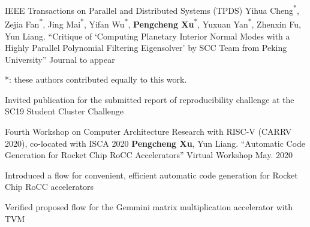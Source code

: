 
\clearpage



\begin{cventries}

  \cventry
    {IEEE Transactions on Parallel and Distributed Systems (TPDS)}
    {{\normalfont Yihua Cheng\textsuperscript{*}, Zejia Fan\textsuperscript{*}, Jing Mai\textsuperscript{*}, Yifan Wu\textsuperscript{*}, \textbf{Pengcheng Xu}\textsuperscript{*}, Yuxuan Yan\textsuperscript{*}, Zhenxin Fu, Yun Liang. ``Critique of `Computing Planetary Interior Normal Modes with a Highly Parallel Polynomial Filtering Eigensolver' by SCC Team from Peking University''}}
    {Journal} %
    {to appear} %
    {
      \begin{cvitems} %
      \item {*: these authors contributed equally to this work.}
      \item {Invited publication for the submitted report of reproducibility challenge at the SC19 Student Cluster Challenge}
      \end{cvitems}
    }

  \cventry
    {Fourth Workshop on Computer Architecture Research with RISC-V (CARRV 2020), co-located with ISCA 2020} %
    {{\normalfont \textbf{Pengcheng Xu}, Yun Liang. ``Automatic Code Generation for Rocket Chip RoCC Accelerators''}} %
    {Virtual Workshop} %
    {May. 2020} %
    {
      \begin{cvitems} %
        \item {Introduced a flow for convenient, efficient automatic code generation for Rocket Chip RoCC accelerators}
        \item {Verified proposed flow for the Gemmini matrix multiplication accelerator with TVM}
      \end{cvitems}
    }
\end{cventries}
